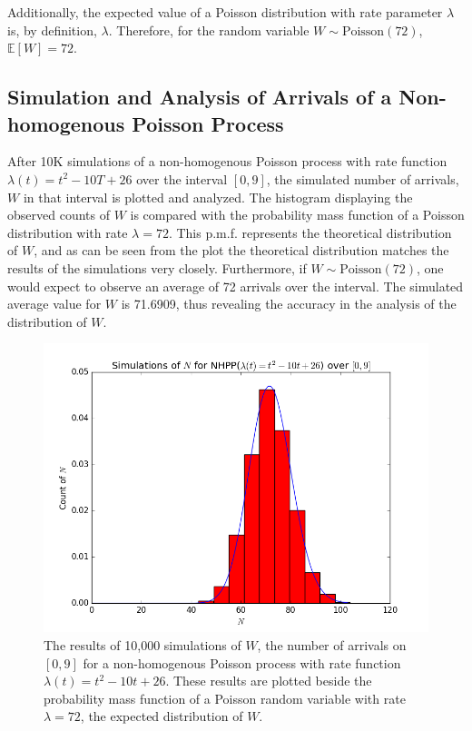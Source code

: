 \documentclass[11pt, oneside]{article}   	%
\begin{document}
Additionally, the expected value of a Poisson distribution with rate parameter $\lambda$ is, by definition, $\lambda$. Therefore, for the random variable $W \sim \text{Poisson}(72)$, $\mathbb{E}[W]=72$.

\subsection{Simulation and Analysis of Arrivals of a Non-homogenous Poisson Process}
After 10K simulations of a non-homogenous Poisson process with rate function $\lambda(t) =t^2-10T+26$ over the interval $[0,9]$, the simulated number of arrivals, $W$ in that interval is plotted and analyzed. The histogram displaying the observed counts of $W$ is compared with the probability mass function of a Poisson distribution with rate $\lambda = 72$. This p.m.f. represents the theoretical distribution of $W$, and as can be seen from the plot the theoretical distribution matches the results of the simulations very closely. Furthermore, if $W \sim \text{Poisson}(72)$, one would expect to observe an average of 72 arrivals over the interval. The simulated average value for $W$ is 71.6909, thus revealing the accuracy in the analysis of the distribution of $W$.
\begin{figure}[H]
\includegraphics[scale=.5]{nhpp_n}
\caption{The results of 10,000 simulations of $W$, the number of arrivals on $[0,9]$ for a non-homogenous Poisson process with rate function $\lambda(t)=t^2-10t+26$. These results are plotted beside the probability mass function of a Poisson random variable with rate $\lambda=72$, the expected distribution of $W$.}
\label{fig:x}
\end{figure}
\end{document}
